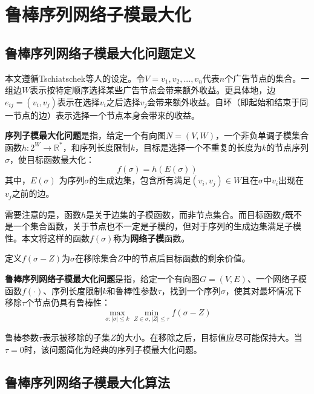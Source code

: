 \chapter{鲁棒序列网络子模最大化}

\section{鲁棒序列网络子模最大化问题定义}
\label{sec:3_1}
本文遵循Tschiatschek等人\cite{tschiatschek2017selecting}的设定。令$V={v_1,v_2,...,v_n}$代表$n$个广告节点的集合。一组边\(W\)表示按特定顺序选择某些广告节点会带来额外收益。更具体地，边\(e_{ij} = (v_i,v_j)\)表示在选择\(v_i\)之后选择\(v_j\)会带来额外收益。自环（即起始和结束于同一节点的边）表示选择一个节点本身会带来的收益。

\begin{definition}
{\bfseries 序列子模最大化问题}是指，给定一个有向图\(N = (V,W)\)，一个非负单调子模集合函数\(h: 2^W \rightarrow \mathbb{R}^{*}\)，和序列长度限制\(k\)，目标是选择一个不重复的长度为\(k\)的节点序列\(\sigma\)，使目标函数最大化：
\begin{equation}
    f(\sigma)=h(E(\sigma))
\end{equation}
\noindent 其中，\(E(\sigma)\) 为序列$\sigma$的生成边集，包含所有满足\((v_i,v_j)\in W\)且在\(\sigma\)中\(v_i\)出现在\(v_j\)之前的边。
\end{definition}

需要注意的是，函数\(h\)是关于边集的子模函数，而非节点集合。而目标函数\(f\)既不是一个集合函数，关于节点也不一定是子模的，但对于序列的生成边集满足子模性。本文将这样的函数\(f(\sigma)\)称为{\bfseries 网络子模}函数。

定义\(f(\sigma - Z)\)为$\sigma$在移除集合\(Z\)中的节点后目标函数的剩余价值。
\begin{definition}
{\bfseries 鲁棒序列网络子模最大化问题}是指，给定一个有向图\(G=(V,E)\)、一个网络子模函数\(f(\cdot)\)、序列长度限制$k$和鲁棒性参数\(\tau\)，找到一个序列\(\sigma\)，使其对最坏情况下移除\(\tau\)个节点仍具有鲁棒性：
\begin{equation}
    \max_{\sigma:|\sigma|\le k} \min_{Z\in \sigma,|Z|\le \tau} f(\sigma - Z)
\end{equation}
\end{definition}

鲁棒参数\(\tau\)表示被移除的子集\(Z\)的大小。在移除之后，目标值应尽可能保持大。当\(\tau = 0\)时，该问题简化为经典的序列子模最大化问题\cite{mitrovic2018submodularity}。

\section{鲁棒序列网络子模最大化算法}
\label{sec:3_2}

